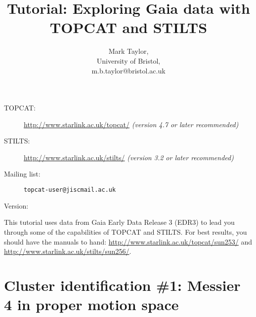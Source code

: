 \documentclass{article}
\newcommand{\turl}[1]{{\color{blue}\url{#1}}}
\begin{document}
\raggedright

\title{Tutorial: Exploring Gaia data with TOPCAT and STILTS}
\author{Mark Taylor,\\
        University of Bristol,\\
        m.b.taylor@bristol.ac.uk}
\date{\vspace*{-4ex}}  %

\maketitle

\begin{description}
  \item[TOPCAT:] \turl{http://www.starlink.ac.uk/topcat/}
                 {\em (version 4.7 or later recommended)}
  \item[STILTS:] \turl{http://www.starlink.ac.uk/stilts/}
                 {\em (version 3.2 or later recommended)}
  \item[Mailing list:] {\tt topcat-user@jiscmail.ac.uk}
  \item[Version:] {\tt }
\end{description}

\tableofcontents

\vspace{3ex}
This tutorial uses data from Gaia Early Data Release 3 (EDR3) \cite{edr3}
to lead you through some of the capabilities of TOPCAT and STILTS.
For best results, you should have the manuals to hand:
\url{http://www.starlink.ac.uk/topcat/sun253/} and
\url{http://www.starlink.ac.uk/stilts/sun256/}.

\newpage

\section{Cluster identification \#1: Messier 4 in proper motion space}
\label{sec:m4}
\end{document}
